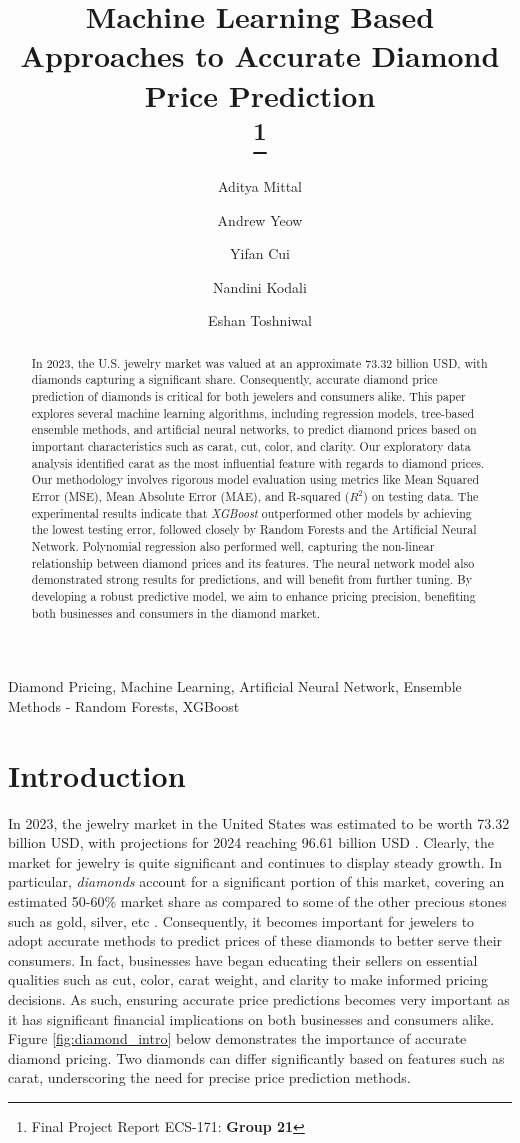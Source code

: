 \documentclass[conference]{IEEEtran}
\title{Machine Learning Based Approaches to Accurate Diamond Price Prediction\\
\thanks{Final Project Report ECS-171: \textbf{Group 21}}
}
\author[1]{Aditya Mittal}
\author[2]{Andrew Yeow}
\author[3]{Yifan Cui}
\author[4]{Nandini Kodali}
\author[5]{Eshan Toshniwal}
\affil[1]{Department of Statistics; University of California, Davis}
\affil[2]{Department of Computer Science; University of California, Davis}
\affil[3]{Department of Computer Science; University of California, Davis}
\affil[4]{Department of Computer Science; University of California, Davis}
\affil[5]{Department of Computer Science; University of California, Davis}
\begin{document}
 
\maketitle

\begin{abstract}
In 2023, the U.S. jewelry market was valued at an approximate 73.32 billion USD, with diamonds capturing a significant share. Consequently, accurate diamond price prediction of diamonds is critical for both jewelers and consumers alike. This paper explores several machine learning algorithms, including regression models, tree-based ensemble methods, and artificial neural networks, to predict diamond prices based on important characteristics such as carat, cut, color, and clarity. Our exploratory data analysis identified carat as the most influential feature with regards to diamond prices. Our methodology involves rigorous model evaluation using metrics like Mean Squared Error (MSE), Mean Absolute Error (MAE), and R-squared ($R^2$) on testing data. The experimental results indicate that \emph{XGBoost} outperformed other models by achieving the lowest testing error, followed closely by Random Forests and the Artificial Neural Network. Polynomial regression also performed well, capturing the non-linear relationship between diamond prices and its features. The neural network model also demonstrated strong results for predictions, and will benefit from further tuning. By developing a robust predictive model, we aim to enhance pricing precision, benefiting both businesses and consumers in the diamond market.
\end{abstract}

\begin{IEEEkeywords}
Diamond Pricing, Machine Learning, Artificial Neural Network, Ensemble Methods - Random Forests, XGBoost
\end{IEEEkeywords}

\section{Introduction}

In 2023, the jewelry market in the United States was estimated to be worth 73.32 billion USD, with projections for 2024 reaching 96.61 billion USD \cite{us}. Clearly, the market for jewelry is quite significant and continues to display steady growth. In particular, \emph{diamonds} account for a significant portion of this market, covering an estimated 50-60\% market share as compared to some of the other precious stones such as gold, silver, etc \cite{diamond}. Consequently, it becomes important for jewelers to adopt accurate methods to predict prices of these diamonds to better serve their consumers. In fact, businesses have began educating their sellers on essential qualities such as cut, color, carat weight, and clarity to make informed pricing decisions. As such, ensuring accurate price predictions becomes very important as it has significant financial implications on both businesses and consumers alike. Figure \ref{fig:diamond_intro} below demonstrates the importance of accurate diamond pricing. Two diamonds can differ significantly based on features such as carat, underscoring the need for precise price prediction methods. 
\end{document}
